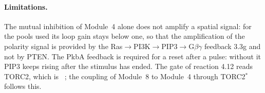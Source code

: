 \paragraph{Limitations.}
The mutual inhibition of Module~4 alone does not amplify a spatial signal: for the pools used its loop gain stays below one, so that the amplification of the polarity signal is provided by the Ras$\to$PI3K$\to$PIP3$\to$G$\beta\gamma$ feedback 3.3g and not by PTEN.
The PkbA feedback is required for a reset after a pulse: without it PIP3 keeps rising after the stimulus has ended.
The gate of reaction 4.12 reads TORC2, which is ~\cite{cai2010}; the coupling of Module~8 to Module~4 through TORC2$^*$ follows this.
